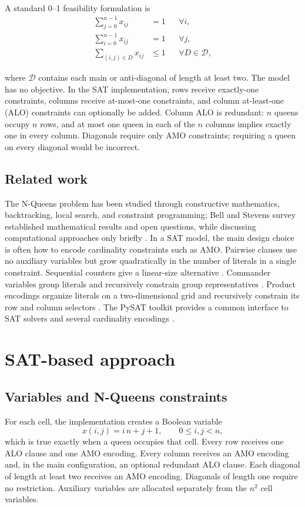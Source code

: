 \documentclass[a4paper,fleqn]{cas-sc}
\begin{document}
\begin{samepage}
A standard 0--1 feasibility formulation is
\begin{align}
  \sum_{j=0}^{n-1}x_{ij} &= 1 && \forall i, \label{eq:row}\tag{1a}\\
  \sum_{i=0}^{n-1}x_{ij} &= 1 && \forall j, \label{eq:col}\tag{1b}\\
  \sum_{(i,j)\in D}x_{ij} &\leq 1 && \forall D\in\mathcal{D}, \label{eq:diag}\tag{1c}
\end{align}
\end{samepage}
\setcounter{equation}{1}
where $\mathcal{D}$ contains each main or anti-diagonal of length at least two. The model has no objective. In the SAT implementation, rows receive exactly-one constraints, columns receive at-most-one constraints, and column at-least-one (ALO) constraints can optionally be added. Column ALO is redundant: $n$ queens occupy $n$ rows, and at most one queen in each of the $n$ columns implies exactly one in every column. Diagonals require only AMO constraints; requiring a queen on every diagonal would be incorrect.

\subsection{Related work}
The N-Queens problem has been studied through constructive mathematics, backtracking, local search, and constraint programming; Bell and Stevens survey established mathematical results and open questions, while discussing computational approaches only briefly \cite{BellStevens2009}. In a SAT model, the main design choice is often how to encode cardinality constraints such as AMO. Pairwise clauses use no auxiliary variables but grow quadratically in the number of literals in a single constraint. Sequential counters give a linear-size alternative \cite{Sinz2005}. Commander variables group literals and recursively constrain group representatives \cite{KlieberKwon2007}. Product encodings organize literals on a two-dimensional grid and recursively constrain its row and column selectors \cite{Chen2010}. The PySAT toolkit provides a common interface to SAT solvers and several cardinality encodings \cite{Ignatiev2018}.

\section{SAT-based approach}
\subsection{Variables and N-Queens constraints}
For each cell, the implementation creates a Boolean variable
\begin{equation}
  x(i,j)=i\,n+j+1,\qquad 0\leq i,j<n,
\end{equation}
which is true exactly when a queen occupies that cell. Every row receives one ALO clause and one AMO encoding. Every column receives an AMO encoding and, in the main configuration, an optional redundant ALO clause. Each diagonal of length at least two receives an AMO encoding. Diagonals of length one require no restriction. Auxiliary variables are allocated separately from the $n^2$ cell variables.
\end{document}
